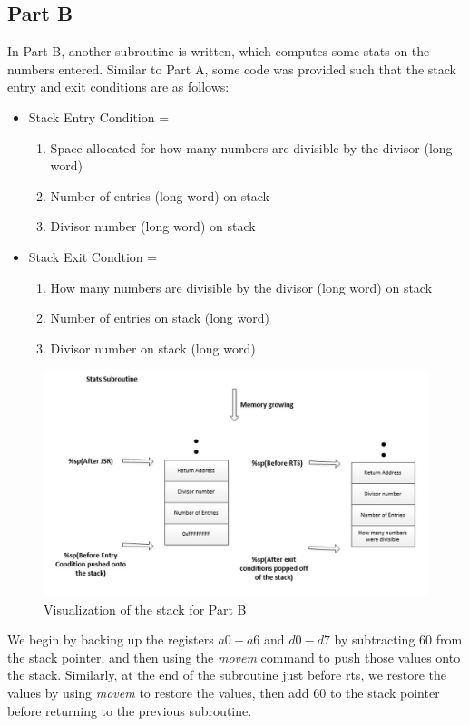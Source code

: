 \documentclass[letterpaper]{article}
\begin{document}
  \subsection{Part B}
    In Part B, another subroutine is written, which computes some stats
    on the numbers entered. Similar to Part A, some code was provided
    such that the stack entry and exit conditions are as follows:

    \begin{itemize}
      \item Stack Entry Condition =
        \begin{enumerate}
          \item Space allocated for how many numbers are divisible by the divisor (long word)
          \item Number of entries (long word) on stack
          \item Divisor number (long word) on stack
        \end{enumerate}
      \item Stack Exit Condtion =
        \begin{enumerate}
          \item How many numbers are divisible by the divisor (long word) on stack
          \item Number of entries on stack (long word)
          \item Divisor number on stack (long word)
        \end{enumerate}
    \end{itemize}

    \begin{figure}[h!]
      \centering
      \includegraphics[width=.8\textwidth]{designb.jpg}
      \caption{Visualization of the stack for Part B}
    \end{figure}

    We begin by backing up the registers $a0-a6$ and $d0-d7$ by
    subtracting 60 from the stack pointer, and then using the \textit{movem}
    command to push those values onto the stack. Similarly, at the end of the
    subroutine just before rts, we restore the values by using \textit{movem} to restore the values,
    then add 60 to the stack pointer before returning to the previous subroutine.
\end{document}
